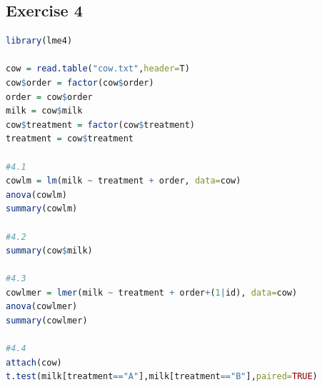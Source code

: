 \documentclass{article}
\begin{document}
    \subsection{Exercise 4}\label{sec:RE4}
      \begin{lstlisting}[language=R]
library(lme4)

cow = read.table("cow.txt",header=T)
cow$order = factor(cow$order)
order = cow$order
milk = cow$milk
cow$treatment = factor(cow$treatment)
treatment = cow$treatment

#4.1
cowlm = lm(milk ~ treatment + order, data=cow)
anova(cowlm)
summary(cowlm)

#4.2
summary(cow$milk)

#4.3
cowlmer = lmer(milk ~ treatment + order+(1|id), data=cow)
anova(cowlmer)
summary(cowlmer)

#4.4
attach(cow)
t.test(milk[treatment=="A"],milk[treatment=="B"],paired=TRUE)

      \end{lstlisting}
\end{document}
